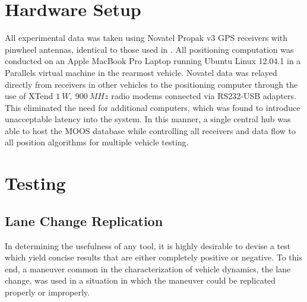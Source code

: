 \documentclass[12pt]{report}
\begin{document}
\section{Hardware Setup}
\label{sec:hardware}

All experimental data was taken using Novatel Propak v3 GPS receivers with pinwheel antennas, identical to those used in \cite{scottthesis}. All positioning computation was conducted on an Apple MacBook Pro Laptop running Ubuntu Linux 12.04.1 in a Parallels virtual machine in the rearmost vehicle. Novatel data was relayed directly from receivers in other vehicles to the positioning computer through the use of XTend $1~W,~900~MHz$ radio modems connected via RS232-USB adapters. This eliminated the need for additional computers, which was found to introduce unacceptable latency into the system. In this manner, a single central hub was able to host the MOOS database while controlling all receivers and data flow to all position algorithms for multiple vehicle testing.





\section{Testing}
\label{sec:test}

\subsection{Lane Change Replication}
\label{sec:lanechange}

In determining the usefulness of any tool, it is highly desirable to devise a test which yield concise results that are either completely positive or negative. To this end, a maneuver common in the characterization of vehicle dynamics, the lane change, was used in a situation in which the maneuver could be replicated properly or improperly.
\end{document}
